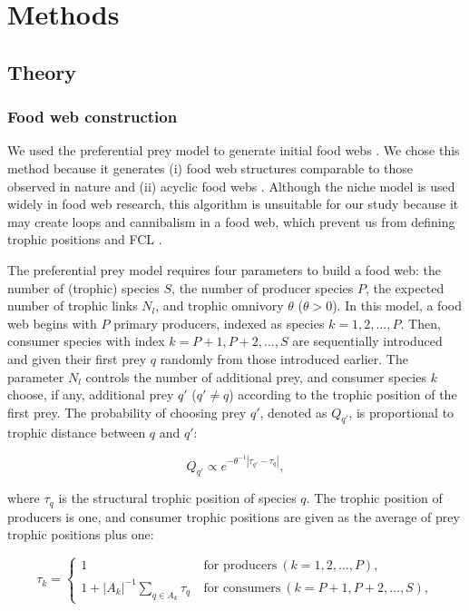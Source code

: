 \documentclass[11pt, class=article, crop=false]{standalone}
\begin{document}
\section{Methods}

\subsection{Theory}

\subsubsection{Food web construction}

We used the preferential prey model to generate initial food webs \citep{johnson_trophic_2014}.
We chose this method because it generates (i) food web structures comparable to those observed in nature and (ii) acyclic food webs \citep{shibasaki_food_2024}.
Although the niche model \citep{williams_simple_2000} is used widely in food web research, this algorithm is unsuitable for our study because it may create loops and cannibalism in a food web, which prevent us from defining trophic positions and FCL \citep{shibasaki_food_2024}.

The preferential prey model requires four parameters to build a food web: the number of (trophic) species $S$, the number of producer species $P$, the expected number of trophic links $N_l$, and trophic omnivory $\theta$ ($\theta > 0$).
In this model, a food web begins with $P$ primary producers, indexed as species $k = 1, 2, ..., P$.
Then, consumer species with index $k = P + 1, P + 2, ..., S$ are sequentially introduced and given their first prey $q$ randomly from those introduced earlier.
The parameter $N_l$ controls the number of additional prey, and consumer species $k$ choose, if any, additional prey $q'$ ($q' \ne q$) according to the trophic position of the first prey.
The probability of choosing prey $q'$, denoted as $Q_{q'}$, is proportional to trophic distance between $q$ and $q'$:

\begin{equation}
    Q_{q'} \propto e^{-\theta^{-1} |\tau_{q'} - \tau_q|},
\end{equation}

where $\tau_q$ is the structural trophic position of species $q$.
The trophic position of producers is one, and
consumer trophic positions are given as the average of prey trophic positions plus one:

\begin{equation}
    \tau_k = 
    \begin{cases}
    1 & ~\text{for producers}~ (k=1, 2, \ldots, P),\\
    1 + |A_{k}|^{-1} \sum_{q \in A_{k}} \tau_q & ~\text{for consumers}~ (k = P+1, P+2, \ldots, S),
    \end{cases}
\end{equation}
\end{document}
